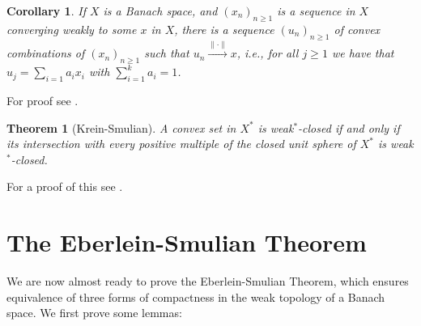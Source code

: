 \documentclass[10pt,twoside,openany,final]{memoir}
\theoremstyle{break}
\newtheorem{theorem}[section]{Theorem}
\newtheorem{corollary}[section]{Corollary}
\theoremstyle{Break}
\newcommand{\lv}{\lVert}
\newcommand{\rv}{\rVert}
\begin{document}
\begin{corollary}\label{cor: weak => seq converging in norm to x}
If $X$ is a Banach space, and $(x_{n})_{n\geq 1}$ is a sequence in $X$ converging weakly to some $x$ in $X$, there is a sequence $(u_{n})_{n\geq 1}$ of convex combinations of $(x_{n})_{n\geq 1}$ such that $u_{n} \stackrel{\lv \cdot \rv}{\to} x$, i.e., for all $j \geq 1$ we have that $u_{j}=\sum_{i=1} a_{i} x_{i}$ with $\sum_{i=1}^k a_{i}= 1$.
\end{corollary}
\noindent For proof see \cite[Corollary v.3.14][422]{dunford1971linear}.

\begin{theorem}[Krein-Smulian]\label{thm:krein-smulian}
A convex set in $X^*$ is weak$^*$-closed if and only if its intersection with every positive multiple of the closed unit sphere of $X^*$ is weak$^*$-closed. 
\end{theorem}
\noindent For a proof of this see \cite[429]{dunford1971linear}.

\chapter{The Eberlein-Smulian Theorem}
We are now almost ready to prove the Eberlein-Smulian Theorem, which ensures equivalence of three forms of compactness in the weak topology of a Banach space. We first prove some lemmas:
\end{document}
